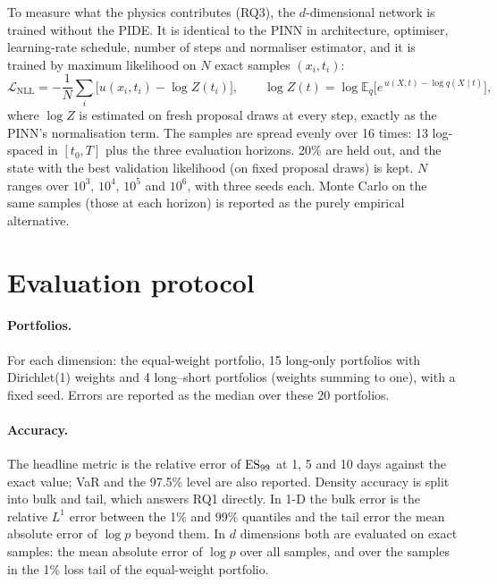 To measure what the physics contributes (RQ3), the $d$-dimensional network is trained without the PIDE. It is
identical to the PINN in architecture, optimiser, learning-rate schedule, number of steps and normaliser
estimator, and it is trained by maximum likelihood on $N$ exact samples $(x_i, t_i)$:
\begin{equation}
  \mathcal{L}_{\mathrm{NLL}} = -\frac1N \sum_i \Big[u(x_i, t_i) - \log Z(t_i)\Big], \qquad
  \log Z(t) = \log \mathbb{E}_{q}\!\Big[e^{\,u(X,t) - \log q(X \mid t)}\Big],
\end{equation}
where $\log Z$ is estimated on fresh proposal draws at every step, exactly as the PINN's normalisation term.
The samples are spread evenly over 16 times: 13 log-spaced in $[t_0, T]$ plus the three evaluation horizons.
20\% are held out, and the state with the best validation likelihood (on fixed proposal draws) is kept. $N$
ranges over $10^3$, $10^4$, $10^5$ and $10^6$, with three seeds each. Monte Carlo on the same samples (those at
each horizon) is reported as the purely empirical alternative.

\section{Evaluation protocol}
\label{sec:met-eval}

\paragraph{Portfolios.} For each dimension: the equal-weight portfolio, 15 long-only portfolios with
Dirichlet(1) weights and 4 long--short portfolios (weights summing to one), with a fixed seed. Errors are
reported as the median over these 20 portfolios.

\paragraph{Accuracy.} The headline metric is the relative error of $\mathrm{ES}_{99}$ at 1, 5 and 10 days against the
exact value; VaR and the 97.5\% level are also reported. Density accuracy is split into bulk and tail, which
answers RQ1 directly. In 1-D the bulk error is the relative $L^1$ error between the 1\% and 99\% quantiles and the
tail error the mean absolute error of $\log p$ beyond them. In $d$ dimensions both are evaluated on exact samples:
the mean absolute error of $\log p$ over all samples, and over the samples in the 1\% loss tail of the equal-weight
portfolio.

